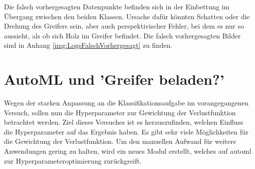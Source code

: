 	Die falsch vorhergesagten Datenpunkte befinden sich in der Einbettung im Übergang zwischen den beiden Klassen.  Ursache dafür könnten Schatten oder die Drehung des Greifers sein, aber auch perspektivischer Fehler, bei dem es nur so aussieht, als ob sich Holz im Greifer befindet. Die falsch vorhergesagten Bilder sind in Anhang \ref{img:LogsFalschVorhergesagt} zu finden.
		
	\section{AutoML und 'Greifer beladen?'}
	\label{sec:Transfer_autoMl}
	Wegen der starken Anpassung an die Klassifikationsaufgabe im vorangegangenen Versuch, sollen nun die Hyperparameter zur Gewichtung der Verlustfunktion betrachtet werden. Ziel dieses Versuches ist es herauszufinden, welchen Einfluss die Hyperparameter auf das Ergebnis haben. Es gibt sehr viele Möglichkeiten für die Gewichtung der Verlustfunktion. Um den manuellen Aufwand für weitere Anwendungen gering zu halten, wird ein neues Modul erstellt, welches auf \ac{automl} zur Hyperparameteroptimierung zurückgreift.
	
